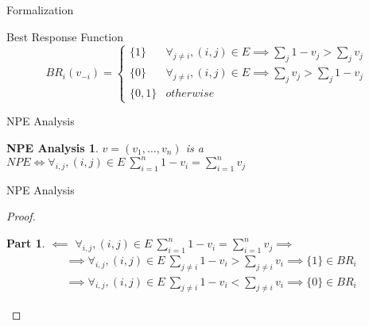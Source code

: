 \documentclass{beamer}
\begin{document}
\begin{frame}[fragile]{Formalization}
  \begin{block}{Best Response Function}
    \[
BR_i(v_{-i}) = 
    \begin{cases}
      \{1\} & \forall_{j \neq i}, (i,j) \in E \implies \sum_j 1 - v_j > \sum_j v_j\\ 
      \{0\} & \forall_{j \neq i}, (i,j) \in E \implies \sum_j v_j > \sum_j 1 - v_j\\
      \{0,1\} & otherwise
    \end{cases}
\]
  \end{block}
\end{frame}

\begin{frame}[fragile]{NPE Analysis}
\newtheorem{npe}{NPE Analysis}
\newtheorem{proofpart}{Part}
\begin{npe}
  $v=(v_1,\dots,v_n)$ is a $NPE \iff \forall_{i,j}, (i,j) \in E\ \sum_{i=1}^n 1 - v_i = \sum_{i=1}^n v_j$
\end{npe}
\end{frame}

\begin{frame}[fragile]{NPE Analysis}
\begin{proof}

\begin{proofpart}
$\impliedby$
$\forall_{i,j}, (i,j) \in E\ \sum_{i=1}^n 1 - v_i = \sum_{i=1}^n v_j \implies$
\begin{subequations}
  \begin{align}
     &\implies \forall_{i,j}, (i,j) \in E\ \sum_{j \neq i} 1 - v_i > \sum_{j \neq i} v_i \implies \{1\} \in BR_i\\
     &\implies \forall_{i,j}, (i,j) \in E\ \sum_{j \neq i} 1 - v_i < \sum_{j \neq i} v_i \implies \{0\} \in BR_i
  \end{align}
\end{subequations}
\end{proofpart}
\end{proof}
\end{frame}
\end{document}
